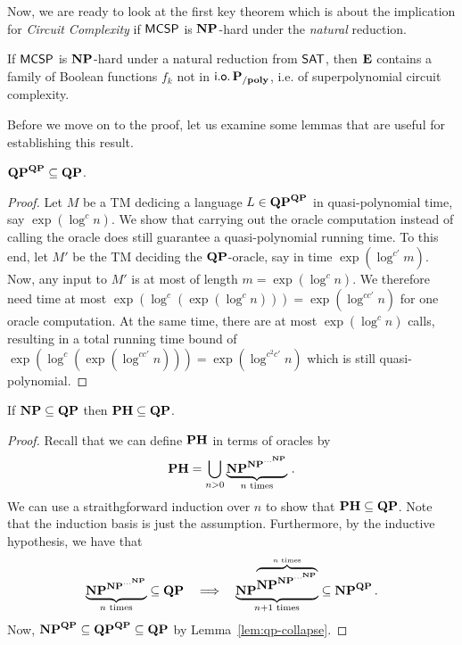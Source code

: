 \documentclass[11pt]{article}
\begin{document}
Now, we are ready to look at the first key theorem which is about the implication for \textit{Circuit Complexity} if $\mathsf{MCSP}$ is $\mathbf{NP}$-hard under the \textit{natural} reduction.

\begin{theorem}[\cite{10.1145/335305.335314}]
  \label{thm:15-1}
  If $\mathsf{MCSP}$ is $\mathbf{NP}$-hard under a natural reduction from
  $\mathsf{SAT}$, then $\mathbf{E}$ contains a family of Boolean functions
  $f_k$ not in $\mathsf{i.o.}\, \mathbf{P_{/poly}}$, i.e. of superpolynomial circuit complexity.
\end{theorem}

Before we move on to the proof, let us examine some lemmas that are useful
for establishing this result.

\begin{lemma}
	\label{lem:qp-collapse}
	$\mathbf{QP}^{\mathbf{QP}} \subseteq \mathbf{QP}$.
\end{lemma}

\begin{proof}
  Let $M$ be a TM dedicing a language $L \in \mathbf{QP}^{\mathbf{QP}}$ in
  quasi-polynomial time, say $\exp(\log^c n)$.
  We show that carrying out the oracle computation instead of calling the
  oracle does still guarantee a quasi-polynomial running time. To this end,
  let $M'$ be the TM deciding the $\mathbf{QP}$-oracle, say in time
  $\exp(\log^{c'} m)$.
  Now, any input to $M'$ is at most of length $m = \exp(\log^c n)$. We
  therefore need time at most
  $\exp(\log^c (\exp(\log^c n))) = \exp(\log^{cc'} n)$
  for one oracle computation. At the same time, there are at most
  $\exp(\log^c n)$ calls, resulting in a total running time bound of
  $\exp(\log^c (\exp(\log^{cc'} n))) = \exp(\log^{c^2 c'} n)$
  which is still quasi-polynomial.
\end{proof}

\begin{lemma}
	\label{lem:ph-sub-qp}
	If $\mathbf{NP} \subseteq \mathbf{QP}$ then
	$\mathbf{PH} \subseteq \mathbf{QP}$.
\end{lemma}

\begin{proof}
  Recall that we can define $\mathbf{PH}$ in terms of oracles by
  \[
    \mathbf{PH} =
    \bigcup_{n > 0} \underbrace{\mathbf{NP}^{\mathbf{NP}^{\cdots^{\mathbf{NP}}}}}_{n \textrm{ times}}
    \,.
  \]
  We can use a straithgforward induction over $n$ to show that
  $\mathbf{PH} \subseteq \mathbf{QP}$.
  Note that the induction basis is just the assumption.
  Furthermore, by the inductive hypothesis, we have that
  \[
    \underbrace{\mathbf{NP}^{\mathbf{NP}^{\cdots^{\mathbf{NP}}}}}_{n \textrm{ times}}
    \subseteq
    \mathbf{QP}
    \quad
    \Longrightarrow
    \quad
    \underbrace{\mathbf{NP}^{\overbrace{
      \mathbf{NP}^{\mathbf{NP}^{\cdots^{\mathbf{NP}}}}
    }^{n \textrm{ times}}}}_{n+1 \textrm{ times}}
    \subseteq
    \mathbf{NP}^{\mathbf{QP}} \,.
  \]
  Now, $\mathbf{NP}^{\mathbf{QP}} \subseteq \mathbf{QP}^{\mathbf{QP}} \subseteq \mathbf{QP} $
  by Lemma~\ref{lem:qp-collapse}.
\end{proof}
\end{document}
